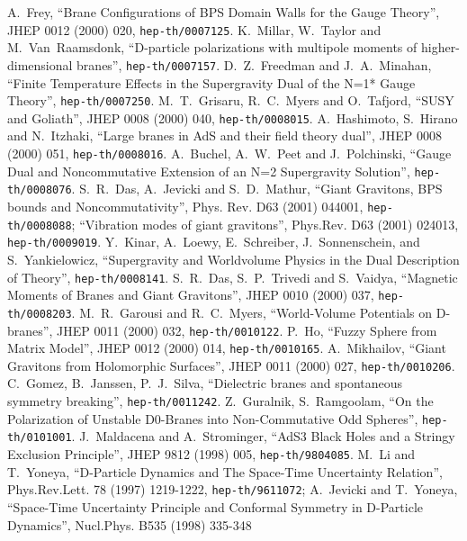 \documentclass[a4paper,12pt]{article}
\begin{document}
{\begin{thebibliography}{30}
 A.~Frey, ``Brane Configurations of BPS Domain Walls for the \coordHE{} Gauge Theory'', JHEP 0012 (2000) 020, {\tt hep-th/0007125}.
 K.~Millar, W.~Taylor and M.~Van~Raamsdonk, ``D-particle polarizations with multipole moments of higher-dimensional branes'', {\tt hep-th/0007157}.
 D.~Z.~Freedman and J.~A.~Minahan, ``Finite Temperature Effects in the Supergravity Dual of the N=1* Gauge Theory'', {\tt hep-th/0007250}.
 M.~T.~Grisaru, R.~C.~Myers and O.~Tafjord, ``SUSY and Goliath'', JHEP 0008 (2000) 040, {\tt hep-th/0008015}.
 A.~Hashimoto, S.~Hirano and N.~Itzhaki, ``Large branes in AdS and their field theory dual'', JHEP 0008 (2000) 051, {\tt hep-th/0008016}.
 A.~Buchel, A.~W.~Peet and J.~Polchinski, ``Gauge Dual and Noncommutative Extension of an N=2 Supergravity Solution'', {\tt hep-th/0008076}.
 S.~R.~Das, A.~Jevicki and S.~D.~Mathur, ``Giant Gravitons, BPS bounds and Noncommutativity'', Phys. Rev. D63 (2001) 044001, {\tt hep-th/0008088}; ``Vibration modes of giant gravitons'', Phys.Rev. D63 (2001) 024013, {\tt hep-th/0009019}.
 Y.~Kinar, A.~Loewy, E.~Schreiber, J.~Sonnenschein, and S.~Yankielowicz, ``Supergravity and Worldvolume Physics in the Dual Description of \coordHE{} Theory'', {\tt hep-th/0008141}.
  S.~R.~Das, S.~P.~Trivedi and S.~Vaidya, ``Magnetic Moments of Branes and Giant Gravitons'', JHEP 0010 (2000) 037, {\tt hep-th/0008203}.
 M.~R.~Garousi and R.~C.~Myers, ``World-Volume Potentials on D-branes'', JHEP 0011 (2000) 032, {\tt hep-th/0010122}.
 P.~Ho, ``Fuzzy Sphere from Matrix Model'', JHEP 0012 (2000) 014, {\tt hep-th/0010165}.
 A.~Mikhailov, ``Giant Gravitons from Holomorphic Surfaces'', JHEP 0011 (2000) 027, {\tt hep-th/0010206}.
  C.~Gomez, B.~Janssen, P.~J.~Silva, ``Dielectric branes and spontaneous symmetry breaking'', {\tt hep-th/0011242}.
  Z.~Guralnik, S.~Ramgoolam, ``On the Polarization of Unstable D0-Branes into Non-Commutative Odd Spheres'', {\tt hep-th/0101001}.
  J.~Maldacena and A.~Strominger, ``AdS3 Black Holes and a Stringy Exclusion Principle'', JHEP 9812 (1998) 005, {\tt hep-th/9804085}.
 M.~Li and T.~Yoneya, ``D-Particle Dynamics and The Space-Time Uncertainty Relation'', Phys.Rev.Lett. 78 (1997) 1219-1222, {\tt hep-th/9611072}; A.~Jevicki and T.~Yoneya, ``Space-Time Uncertainty Principle and Conformal Symmetry in D-Particle Dynamics'', Nucl.Phys. B535 (1998) 335-348

\end{thebibliography}}
\end{document}
